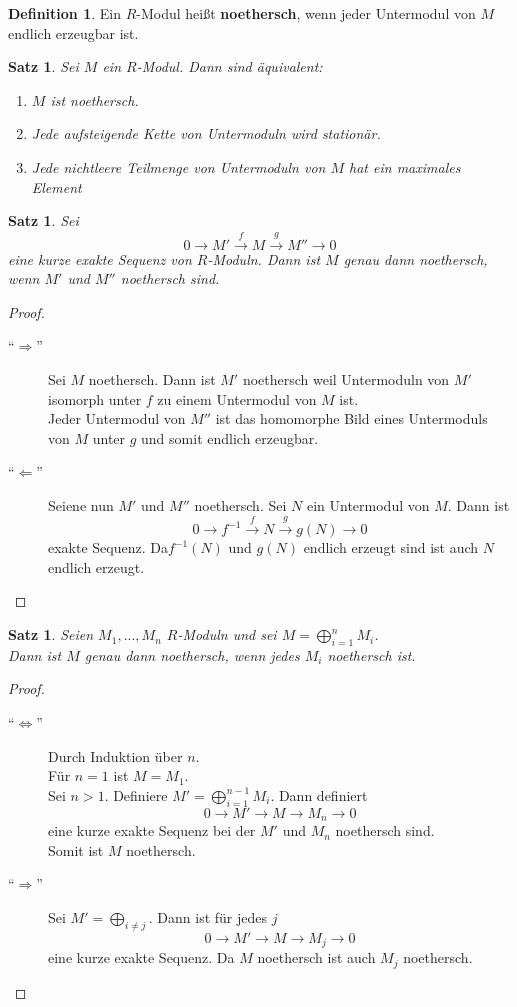 \documentclass[10pt,a4paper]{article}
\theoremstyle{plain}
\newtheorem{satz}[theorem]{Satz}
\theoremstyle{definition}
\newtheorem{definition}[theorem]{Definition}
\theoremstyle{remark}
\begin{document}
	\begin{definition}
		Ein $R$-Modul heißt \textbf{noethersch}, wenn jeder Untermodul von $M$ endlich erzeugbar ist.
	\end{definition}

	\begin{satz}
		Sei $M$ ein $R$-Modul. Dann sind äquivalent:
		\begin{enumerate}
			\item $M$ ist noethersch.
			\item Jede aufsteigende Kette von Untermoduln wird stationär.
			\item Jede nichtleere Teilmenge von Untermoduln von $M$ hat ein maximales Element
		\end{enumerate}
	\end{satz}

	\begin{satz}
		Sei \[0\to M'\xrightarrow{f}M\xrightarrow{g}M''\to0\]
		eine kurze exakte Sequenz von $R$-Moduln. Dann ist $M$ genau dann noethersch, wenn $M'$ und $M''$ noethersch sind.
	\end{satz}
	\begin{proof}
		\begin{description}
			\item[\enquote{$\Rightarrow$}] Sei $M$ noethersch. Dann ist $M'$ noethersch weil Untermoduln von $M'$ isomorph unter $f$ zu einem Untermodul von $M$ ist.\\
			Jeder Untermodul von $M''$ ist das homomorphe Bild eines Untermoduls von $M$ unter $g$ und somit endlich erzeugbar.
			\item[\enquote{$\Leftarrow$}] Seiene nun $M'$ und $M''$ noethersch. Sei $N$ ein Untermodul von $M$. Dann ist
			\[0\to f^{-1}\xrightarrow{f}N\xrightarrow{g}g(N)\to0\]
			exakte Sequenz. Da$f^{-1}(N)$ und $g(N)$ endlich erzeugt sind ist auch $N$ endlich erzeugt.
		\end{description}
	\end{proof}

	\begin{satz}
		Seien $M_1,...,M_n$ $R$-Moduln und sei $M=\bigoplus_{i=1}^n M_i$.\\
		Dann ist $M$ genau dann noethersch, wenn jedes $M_i$ noethersch ist.
	\end{satz}
	\begin{proof}
		\begin{description}
			\item[\enquote{$\Leftrightarrow$}] Durch Induktion über $n$. \\
			Für $n=1$ ist $M=M_1$.\\
			Sei $n>1$. Definiere $M'=\bigoplus_{i=1}^{n-1}M_i$. Dann definiert
			\[0\to M'\xrightarrow{ }M\xrightarrow{ }M_n\to0\]
			eine kurze exakte Sequenz bei der $M'$ und $M_n$ noethersch sind.\\
			Somit ist $M$ noethersch.
			\item[\enquote{$\Rightarrow$}] Sei $M'=\bigoplus_{i\neq j}$. Dann ist für jedes $j$
			\[0\to M'\xrightarrow{ }M\xrightarrow{ }M_j\to0\]
			eine kurze exakte Sequenz. Da $M$ noethersch ist auch $M_j$ noethersch.
		\end{description}
	\end{proof}
\end{document}
